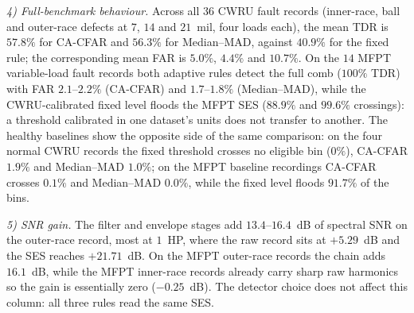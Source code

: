 \emph{4) Full-benchmark behaviour.} Across all $36$ CWRU fault records
(inner-race, ball and outer-race defects at $7$, $14$ and $21$~mil, four loads
each), the mean TDR is $57.8\%$ for CA-CFAR and $56.3\%$ for Median--MAD,
against $40.9\%$ for the fixed rule; the corresponding mean FAR is $5.0\%$,
$4.4\%$ and $10.7\%$. On the $14$ MFPT variable-load fault records both adaptive
rules detect the full comb ($100\%$ TDR) with FAR $2.1$--$2.2\%$ (CA-CFAR) and
$1.7$--$1.8\%$ (Median--MAD), while
the CWRU-calibrated fixed level floods the MFPT SES ($88.9\%$ and $99.6\%$
crossings): a threshold calibrated in one dataset's units does not transfer to
another. The healthy baselines show the opposite side of the same comparison:
on the four normal CWRU records the fixed threshold crosses no eligible bin
($0\%$), CA-CFAR $1.9\%$ and Median--MAD $1.0\%$; on the MFPT baseline
recordings CA-CFAR crosses $0.1\%$ and Median--MAD $0.0\%$, while the fixed
level floods $91.7\%$ of the bins.

\emph{5) SNR gain.} The filter and envelope stages add $13.4$--$16.4$~dB of
spectral SNR on the outer-race record, most at $1$~HP, where the raw record
sits at $+5.29$~dB and the SES reaches $+21.71$~dB. On the MFPT outer-race
records the chain adds $16.1$~dB, while the MFPT inner-race records already
carry sharp raw harmonics so the gain is essentially zero ($-0.25$~dB). The
detector choice does not affect this column: all three rules read the same
SES.
